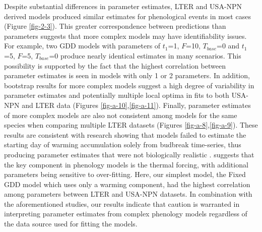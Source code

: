 Despite substantial differences in parameter estimates, LTER and USA-NPN derived models produced similar estimates for phenological events in most cases (Figure \ref{fig-2-3}). This greater correspondence between predictions than parameters suggests that more complex models may have identifiability issues. For example, two GDD models with parameters of $t_{1}$=1, $F$=10, $T_{base}$=0 and $t_{1}$=5, $F$=5, $T_{base}$=0 produce nearly identical estimates in many scenarios. This possibility is supported by the fact that the highest correlation between parameter estimates is seen in models with only 1 or 2 parameters. In addition, bootstrap results for more complex models suggest a high degree of variability in parameter estimates and potentially multiple local optima in fits to both USA-NPN and LTER data (Figures \ref{fig-a-10},\ref{fig-a-11}). Finally, parameter estimates of more complex models are also not consistent among models for the same species when comparing multiple LTER datasets (Figures \ref{fig-a-8},\ref{fig-a-9}). These results are consistent with research showing that models failed to estimate the starting day of warming accumulation solely from budbreak time-series, thus producing parameter estimates that were not biologically realistic \citep{chuine2016}. \cite{basler2016} suggests that the key component in phenology models is the thermal forcing, with additional parameters being sensitive to over-fitting. Here, our simplest model, the Fixed GDD model which uses only a warming component, had the highest correlation among parameters between LTER and USA-NPN datasets. In combination with the aforementioned studies, our results indicate that caution is warranted in interpreting parameter estimates from complex phenology models regardless of the data source used for fitting the models.

